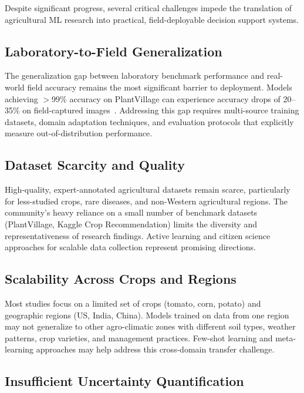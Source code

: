 \documentclass[journal]{IEEEtran}
\begin{document}
Despite significant progress, several critical challenges impede the translation of agricultural ML research into practical, field-deployable decision support systems.

\subsection{Laboratory-to-Field Generalization}

The generalization gap between laboratory benchmark performance and real-world field accuracy remains the most significant barrier to deployment. Models achieving $>$99\% accuracy on PlantVillage can experience accuracy drops of 20--35\% on field-captured images~\cite{barbedo2018factors,singh2018plantdoc}. Addressing this gap requires multi-source training datasets, domain adaptation techniques, and evaluation protocols that explicitly measure out-of-distribution performance.

\subsection{Dataset Scarcity and Quality}

High-quality, expert-annotated agricultural datasets remain scarce, particularly for less-studied crops, rare diseases, and non-Western agricultural regions. The community's heavy reliance on a small number of benchmark datasets (PlantVillage, Kaggle Crop Recommendation) limits the diversity and representativeness of research findings. Active learning and citizen science approaches for scalable data collection represent promising directions.

\subsection{Scalability Across Crops and Regions}

Most studies focus on a limited set of crops (tomato, corn, potato) and geographic regions (US, India, China). Models trained on data from one region may not generalize to other agro-climatic zones with different soil types, weather patterns, crop varieties, and management practices. Few-shot learning and meta-learning approaches may help address this cross-domain transfer challenge.

\subsection{Insufficient Uncertainty Quantification}
\end{document}
